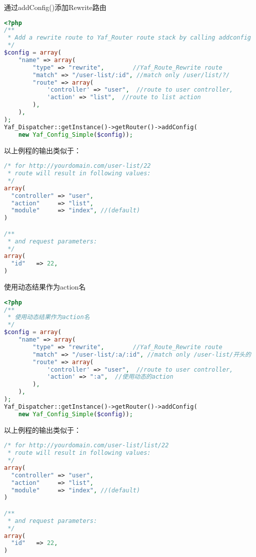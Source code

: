 \begin{example}
通过addConfig()添加Rewrite路由
\begin{lstlisting}[language=PHP]
<?php
/**
 * Add a rewrite route to Yaf_Router route stack by calling addconfig
 */
$config = array(
    "name" => array(
        "type" => "rewrite",        //Yaf_Route_Rewrite route
        "match" => "/user-list/:id", //match only /user/list/?/
        "route" => array(
            'controller' => "user",  //route to user controller,
            'action' => "list",  //route to list action
        ),
    ),
);
Yaf_Dispatcher::getInstance()->getRouter()->addConfig(
    new Yaf_Config_Simple($config));
\end{lstlisting}
\end{example}

以上例程的输出类似于：



\begin{lstlisting}[language=PHP]
/* for http://yourdomain.com/user-list/22
 * route will result in following values:
 */
array(
  "controller" => "user",
  "action"     => "list",
  "module"     => "index", //(default)
)

/**
 * and request parameters:
 */
array(
  "id"   => 22,
)
\end{lstlisting}


\begin{example}
使用动态结果作为action名
\begin{lstlisting}[language=PHP]
<?php
/**
 * 使用动态结果作为action名
 */
$config = array(
    "name" => array(
        "type" => "rewrite",        //Yaf_Route_Rewrite route
        "match" => "/user-list/:a/:id", //match only /user-list/开头的
        "route" => array(
            'controller' => "user",  //route to user controller,
            'action' => ":a",  //使用动态的action
        ),
    ),
);
Yaf_Dispatcher::getInstance()->getRouter()->addConfig(
    new Yaf_Config_Simple($config));
\end{lstlisting}
\end{example}

以上例程的输出类似于：



\begin{lstlisting}[language=PHP]
/* for http://yourdomain.com/user-list/list/22
 * route will result in following values:
 */
array(
  "controller" => "user",
  "action"     => "list",
  "module"     => "index", //(default)
)

/**
 * and request parameters:
 */
array(
  "id"   => 22,
)
\end{lstlisting}





